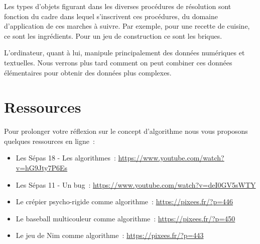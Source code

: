 			Les types d’objets figurant 
			dans les diverses procédures de résolution
			sont fonction du cadre 
			dans lequel s’inscrivent ces procédures, 
			du domaine d’application de ces marches à suivre. 
			Par exemple, pour une recette de cuisine, 
			ce sont les ingrédients. 
			Pour un jeu de construction ce sont les briques.
			
			L’ordinateur, quant à lui, manipule principalement
			des données numériques et textuelles. 
			Nous verrons plus tard 
			comment on peut combiner ces données élémentaires 
			pour obtenir des données plus complexes.
	
	\section{Ressources}
	
		Pour prolonger votre réflexion sur le concept d’algorithme
		nous vous proposons quelques ressources en ligne~:
		\begin{itemize}
		\item
			Les Sépas 18 - Les algorithmes~:
			\url{https://www.youtube.com/watch?v=hG9Jty7P6Es}
		\item
			Les Sépas 11 - Un bug~:
			\url{https://www.youtube.com/watch?v=deI0GV5sWTY}
		\item
			Le crépier psycho-rigide comme algorithme~:
			\url{https://pixees.fr/?p=446}
		\item
			Le baseball multicouleur comme algorithme~:
			\url{https://pixees.fr/?p=450}
		\item
			Le jeu de Nim comme algorithme~:
			\url{https://pixees.fr/?p=443}
		\end{itemize}
		

